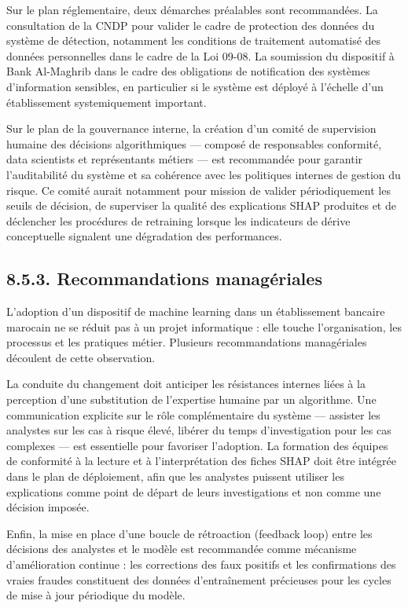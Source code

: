 Sur le plan réglementaire, deux démarches préalables sont recommandées. La consultation de la CNDP pour valider le cadre de protection des données du système de détection, notamment les conditions de traitement automatisé des données personnelles dans le cadre de la Loi 09-08. La soumission du dispositif à Bank Al-Maghrib dans le cadre des obligations de notification des systèmes d'information sensibles, en particulier si le système est déployé à l'échelle d'un établissement systemiquement important.

Sur le plan de la gouvernance interne, la création d'un comité de supervision humaine des décisions algorithmiques — composé de responsables conformité, data scientists et représentants métiers — est recommandée pour garantir l'auditabilité du système et sa cohérence avec les politiques internes de gestion du risque. Ce comité aurait notamment pour mission de valider périodiquement les seuils de décision, de superviser la qualité des explications SHAP produites et de déclencher les procédures de retraining lorsque les indicateurs de dérive conceptuelle signalent une dégradation des performances.

\subsection{8.5.3. Recommandations managériales}

L'adoption d'un dispositif de machine learning dans un établissement bancaire marocain ne se réduit pas à un projet informatique : elle touche l'organisation, les processus et les pratiques métier. Plusieurs recommandations managériales découlent de cette observation.

La conduite du changement doit anticiper les résistances internes liées à la perception d'une substitution de l'expertise humaine par un algorithme. Une communication explicite sur le rôle complémentaire du système — assister les analystes sur les cas à risque élevé, libérer du temps d'investigation pour les cas complexes — est essentielle pour favoriser l'adoption. La formation des équipes de conformité à la lecture et à l'interprétation des fiches SHAP doit être intégrée dans le plan de déploiement, afin que les analystes puissent utiliser les explications comme point de départ de leurs investigations et non comme une décision imposée.

Enfin, la mise en place d'une boucle de rétroaction (feedback loop) entre les décisions des analystes et le modèle est recommandée comme mécanisme d'amélioration continue : les corrections des faux positifs et les confirmations des vraies fraudes constituent des données d'entraînement précieuses pour les cycles de mise à jour périodique du modèle.

